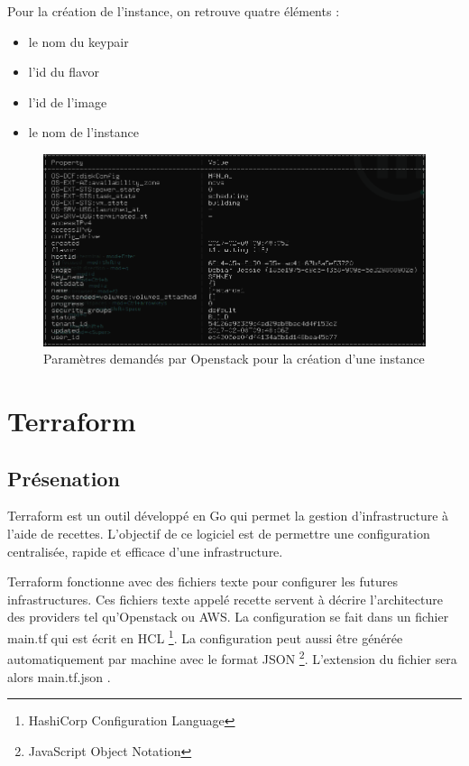 \documentclass[]{article}
\begin{document}
Pour la création de l'instance, on retrouve quatre éléments : 
\begin{itemize}
\item le nom du keypair 
\item l'id du flavor 
\item l'id de l'image
\item le nom de l'instance
\end{itemize}
\vspace{5mm}
\begin{figure}
\centering
\includegraphics{Images/eeee.png}
\caption{Paramètres demandés par Openstack pour la création d'une instance}
\end{figure}

\newpage
\section{Terraform}\label{terraform}

\subsection{Présenation}\label{pruxe9senation}

Terraform est un outil développé en Go qui permet la gestion
d'infrastructure à l'aide de recettes. L'objectif de ce logiciel est de
permettre une configuration centralisée, rapide et efficace d'une
infrastructure.

Terraform fonctionne avec des fichiers texte pour configurer les futures
infrastructures. Ces fichiers texte appelé \og recette
\fg servent à décrire l'architecture des providers tel
qu'Openstack ou AWS. La configuration se fait dans un fichier
\og main.tf \fg qui est écrit en HCL \footnote{HashiCorp Configuration Language}. La configuration peut aussi être
générée automatiquement par machine avec le format JSON \footnote{JavaScript Object Notation}.
L'extension du fichier sera alors \og main.tf.json
\fg.
\end{document}
